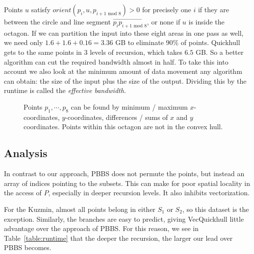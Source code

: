Points $u$ satisfy $orient(p_i, u, p_{i + 1 \text{ mod } 8}) > 0$ for precisely 
one $i$ if they are between the circle and line segment 
$\overrightarrow{p_i p_{i + 1 \text{ mod } 8}}$, or none if 
$u$ is inside the octagon.
If we can partition the input into these eight areas
in one pass as well, we need only $1.6 + 1.6 + 0.16 = 3.36$ GB to eliminate
$90\%$ of points. Quickhull gets to the same points in $3$ levels of
recursion, which takes $6.5$ GB. So a better algorithm can cut the required
bandwidth almost in half. To take this into account we also look at the minimum
amount of data movement any algorithm can obtain: the size of the input plus
the size of the output. Dividing this by the runtime is called the
\textit{effective bandwidth}.

\begin{figure}[ht]
    \caption{Points $p_1, \cdots, p_8$ can be found by minimum / maximum
             $x$-coordinates, $y$-coordinates, differences / sums of 
             $x$ and $y$ coordinates. Points within this octagon are not in 
             the convex hull.}
    \label{fig:akl}
\end{figure}

\subsection{Analysis}

In contrast to our approach, PBBS does not permute the points, but instead
an array of indices pointing to the subsets. This can make for poor spatial
locality in the access of $P$, especially in deeper recursion levels.
It also inhibits vectorization.

For the Kuzmin, almost all points belong in either $S_1$ or $S_2$, so
this dataset is the exception. Similarly, the branches are easy to predict,
giving VecQuickhull little advantage over the approach of
PBBS. For this reason, we see in Table~\ref{table:runtime} that the deeper
the recursion, the larger our lead over PBBS becomes. 

